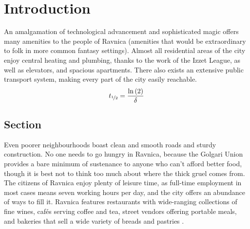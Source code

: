 %
%






\usepackage{blindtext}
\usepackage{layout}



\frontmatter



\cleardoublepage



\cleardoublepage



\cleartoevenpage



\tableofcontents
\thispagestyle{empty}

\cleardoublepage

\mainmatter

\chapter{Introduction}
An amalgamation of technological advancement and sophisticated magic offers many 
amenities to the people of Ravnica (amenities that would be extraordinary to
folk in more common fantasy settings). Almost all residential areas of the city
enjoy central heating and plumbing, thanks to the work of the Izzet League, as
well as elevators, and spacious apartments. There also exists an extensive
public transport system, making every part of the city easily reachable.
\begin{align*}
t_{\nicefrac{1}{2}}=\frac{\ln\left(2\right)}{\delta}
\end{align*}

\section{Section}
Even poorer neighbourhoods boast clean and smooth roads and sturdy construction.
No one needs to go hungry in Ravnica, because the Golgari Union provides a bare
minimum of  sustenance to anyone who can't afford better food, though it is best
not to think too much about where the thick gruel comes from. The citizens of
Ravnica enjoy plenty of leisure time, as full-time employment in most cases
means seven working hours per day, and the city offers an abundance of ways to
fill it. Ravnica features restaurants with wide-ranging collections of fine
wines, cafés serving coffee and tea, street vendors offering portable meals, and
bakeries that sell a wide variety of breads and pastries \citep{Reich2013}.

